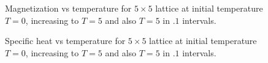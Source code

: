 \documentclass{article}
\begin{document}
\begin{figure}

\caption{Magnetization vs temperature for $5 \times 5$ lattice at initial temperature $T = 0$,
increasing to $T = 5$ and also $T=5$ in $.1$ intervals.}
\end{figure}

\begin{figure}

\caption{Specific heat vs temperature for $5 \times 5$ lattice at initial temperature $T = 0$,
increasing to $T = 5$ and also $T=5$ in $.1$ intervals.}
\end{figure}
\end{document}
